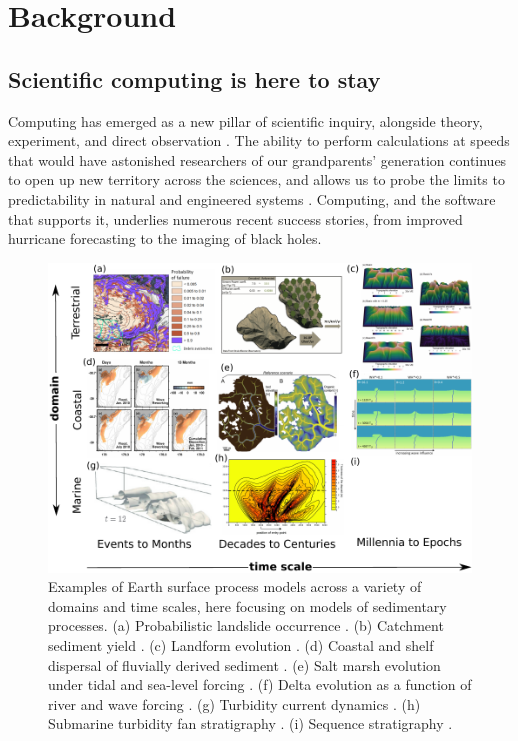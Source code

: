 \documentclass[12pt]{amsart}
\begin{document}
\section{Background}
\label{sec:background}

\subsection{Scientific computing is here to stay}

Computing has emerged as a new pillar of scientific inquiry, alongside theory, experiment, and direct observation  \citep{pitac2005computational}. The ability to perform calculations at speeds that would have astonished researchers of our grandparents' generation continues to open up new territory across the sciences, and allows us to probe the limits to predictability in natural and engineered systems \citep{post2005computational,post2013changing}. Computing, and the software that supports it, underlies numerous recent success stories, from improved hurricane forecasting to the imaging of black holes. 

\begin{figure}[h!]
\centering
\includegraphics[width=6in]{Figures/model_examples.pdf}
\caption{Examples of Earth surface process models across a variety of domains and time scales, here focusing on models of sedimentary processes. (a) Probabilistic landslide occurrence \citep{strauch2018hydroclimatological}. (b) Catchment sediment yield \citep{carriere2020impact}. (c) Landform evolution \citep{barnhart2019terrainbento}. (d) Coastal and shelf dispersal of fluvially derived sediment \citep{kuehl2016source}. (e) Salt marsh evolution under tidal and sea-level forcing \citep{mariotti2018marsh}. (f) Delta evolution as a function of river and wave forcing \citep{ratliff2018exploring}. (g) Turbidity current dynamics \citep{nasr2013polydisperse}. (h) Submarine turbidity fan stratigraphy \citep{groenenberg2010flow}. (i) Sequence stratigraphy \citep{steckler2019developing}.}
\label{fig:modelexamples}
\end{figure}
\end{document}
